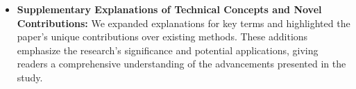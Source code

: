 \documentclass[a4paper,twoside,11pt,dvipsnames]{reviewresponse}
\begin{document}
\begin{itemize}
\item \textbf{Supplementary Explanations of Technical Concepts and Novel Contributions:} We expanded explanations for key terms and highlighted the paper's unique contributions over existing methods. These additions emphasize the research's significance and potential applications, giving readers a comprehensive understanding of the advancements presented in the study.









\end{itemize}
\end{document}
